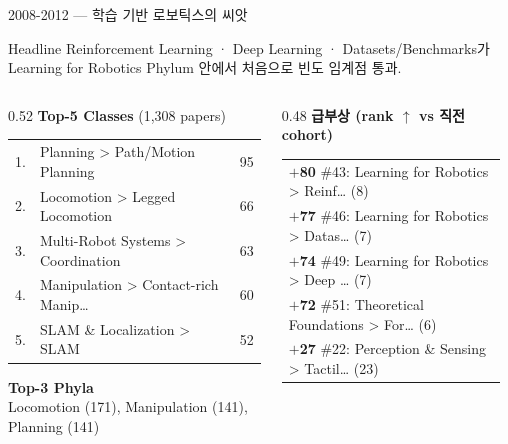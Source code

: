 \documentclass[aspectratio=169,t]{beamer}
\newcommand{\hot}[1]{\textcolor{accentorange}{\textbf{#1}}}
\newcommand{\muted}[1]{\textcolor{mutedgray}{#1}}
\begin{document}
\begin{frame}{2008-2012 \quad — \quad 학습 기반 로보틱스의 씨앗}
\small
\begin{block}{Headline}
Reinforcement Learning · Deep Learning · Datasets/Benchmarks가 Learning for Robotics Phylum 안에서 처음으로 빈도 임계점 통과.
\end{block}
\vspace{4pt}

\begin{columns}[T,onlytextwidth]
\begin{column}{0.52\textwidth}
\textbf{Top-5 Classes} \muted{\scriptsize (1,308 papers)}\\[2pt]
\scriptsize
\begin{tabular}{@{}rlr@{}}
    1. & Planning > Path/Motion Planning & 95 \\
    2. & Locomotion > Legged Locomotion & 66 \\
    3. & Multi-Robot Systems > Coordination & 63 \\
    4. & Manipulation > Contact-rich Manip… & 60 \\
    5. & SLAM \& Localization > SLAM & 52 \\
\end{tabular}
\vspace{8pt}

\textbf{\small Top-3 Phyla}\\[2pt]
\scriptsize Locomotion (171), Manipulation (141), Planning (141)
\end{column}

\begin{column}{0.48\textwidth}
\textbf{급부상 (rank $\uparrow$ vs 직전 cohort)}\\[2pt]
\scriptsize
\begin{tabular}{@{}p{0.95\linewidth}@{}}
    \hot{$+$80} \#43: Learning for Robotics > Reinf… (8) \\
    \hot{$+$77} \#46: Learning for Robotics > Datas… (7) \\
    \hot{$+$74} \#49: Learning for Robotics > Deep … (7) \\
    \hot{$+$72} \#51: Theoretical Foundations > For… (6) \\
    \hot{$+$27} \#22: Perception \& Sensing > Tactil… (23) \\
\end{tabular}
\end{column}
\end{columns}
\end{frame}
\end{document}
